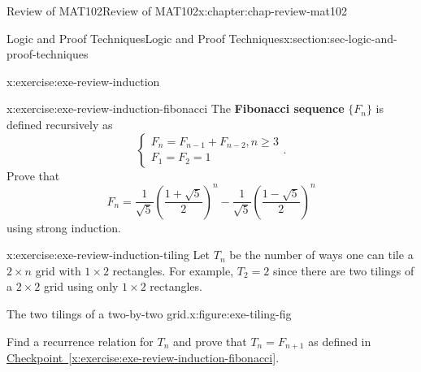 \documentclass[oneside,10pt,]{book}
\newcommand{\xreffont}{\relax}
\newcommand{\terminology}[1]{\textbf{#1}}
\numberwithin{equation}{section}
\begin{document}
\begin{chapterptx}{Review of MAT102}{}{Review of MAT102}{}{}{x:chapter:chap-review-mat102}
\begin{sectionptx}{Logic and Proof Techniques}{}{Logic and Proof Techniques}{}{}{x:section:sec-logic-and-proof-techniques}
\begin{inlineexercise}{}{x:exercise:exe-review-induction}
\begin{enumerate}[label=(\alph*)]
\end{enumerate}
\end{inlineexercise}
\begin{inlineexercise}{}{x:exercise:exe-review-induction-fibonacci}%
The \terminology{Fibonacci sequence} \(\{F_n\}\) is defined recursively as%
\begin{equation*}
\begin{cases} F_n = F_{n-1} + F_{n-2}, n \geq 3 \\
F_1 = F_2 = 1 \end{cases}\text{.}
\end{equation*}
Prove that%
\begin{equation*}
F_n = \frac{1}{\sqrt{5}}\left(\frac{1+\sqrt{5}}{2}\right)^n - \frac{1}{\sqrt{5}}\left(\frac{1-\sqrt{5}}{2}\right)^n
\end{equation*}
using strong induction.%
\end{inlineexercise}
\begin{inlineexercise}{}{x:exercise:exe-review-induction-tiling}%
Let \(T_n\) be the number of ways one can tile a \(2 \times n\) grid with \(1 \times 2\) rectangles. For example, \(T_2 = 2\) since there are two tilings of a \(2 \times 2\) grid using only \(1 \times 2\) rectangles.%
\begin{figureptx}{The two tilings of a two-by-two grid.}{x:figure:exe-tiling-fig}{}%
\begin{image}{0.25}{0.5}{0.25}%
%
\end{image}%
\tcblower
\end{figureptx}%
Find a recurrence relation for \(T_n\) and prove that \(T_n = F_{n+1}\) as defined in \hyperref[x:exercise:exe-review-induction-fibonacci]{Checkpoint~{\xreffont\ref{x:exercise:exe-review-induction-fibonacci}}}.%
\end{inlineexercise}
\end{sectionptx}
%
%
\typeout{************************************************}

\end{chapterptx}
\end{document}
